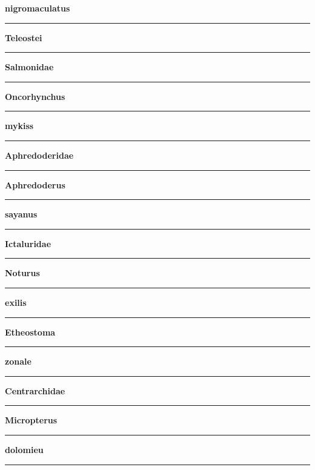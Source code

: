 \documentclass[11pt]{exam}
\newcommand*\Matching[1]{
\ifprintanswers
	\textbf{#1}
\else
	\rule{2.1in}{0.4pt}
\fi
}
\newlength\matchlena
\newlength\matchlenb
\newcommand\MatchQuestion[2]{%
	\setlength\matchlenb{\linewidth}
	\addtolength\matchlenb{-\matchlena}
	\parbox[t]{\matchlena}{\Matching{#1}}\enspace\parbox[t]{\matchlenb}{#2}}
\begin{document}
\begin{questions}
\begin{multicols}{2}
	\question\MatchQuestion{nigromaculatus}{}
	
	
	\columnbreak
	
	\question\MatchQuestion{Teleostei}{}
	\vspace{1.5\baselineskip}
	
	\question\MatchQuestion{Salmonidae}{}
	\vspace{1.5\baselineskip}
	
	\question\MatchQuestion{Oncorhynchus}{}
	\vspace{1.5\baselineskip}
	
	\question\MatchQuestion{mykiss}{}
	\vspace{1.5\baselineskip}
	
	\question\MatchQuestion{Aphredoderidae}{}
	\vspace{1.5\baselineskip}
	
	\question\MatchQuestion{Aphredoderus}{}
	\vspace{1.5\baselineskip}
	
	\question\MatchQuestion{sayanus}{}
	\vspace{1.5\baselineskip}
	
	\question\MatchQuestion{Ictaluridae}{}
	\vspace{1.5\baselineskip}
	
	\question\MatchQuestion{Noturus}{}
	\vspace{1.5\baselineskip}
	
	\question\MatchQuestion{exilis}{}
	\vspace{1.5\baselineskip}
	
	\question\MatchQuestion{Etheostoma}{}
	\vspace{1.5\baselineskip}
	
	\question\MatchQuestion{zonale}{}
	\vspace{1.5\baselineskip}
	
	\question\MatchQuestion{Centrarchidae}{}
	\vspace{1.5\baselineskip}
	
	\question\MatchQuestion{Micropterus}{}
	\vspace{1.5\baselineskip}
	
	\question\MatchQuestion{dolomieu}{}
	\vspace{1.5\baselineskip}
	
\end{multicols}


\end{questions}
\end{document}
